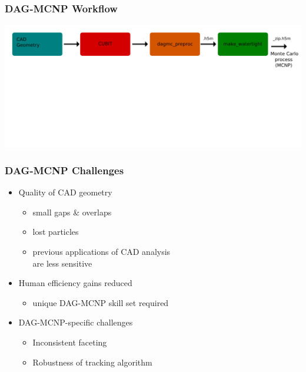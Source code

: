 \documentclass[14pt]{beamer}
\begin{document}
\begin{frame}
\frametitle{DAG-MCNP Workflow}
\includegraphics[scale=0.25, trim = 40 400 0 0]{DAGMC_Wrkflw6.png}
\end{frame}


\begin{frame}
\frametitle{DAG-MCNP Challenges}
\begin{itemize}
\vfill
\item Quality of CAD geometry
	\begin{itemize}
	\item small gaps \& overlaps
	\item lost particles
	\item previous applications of CAD analysis \\
	are less sensitive
	\end{itemize}
\vfill
\item Human efficiency gains reduced
	\begin{itemize}
	\item unique DAG-MCNP skill set required
	\end{itemize}
\vfill
\item DAG-MCNP-specific challenges
	\begin{itemize}
	\item Inconsistent faceting
	\item Robustness of tracking algorithm
	\end{itemize}
\end{itemize}
\end{frame}
\end{document}
